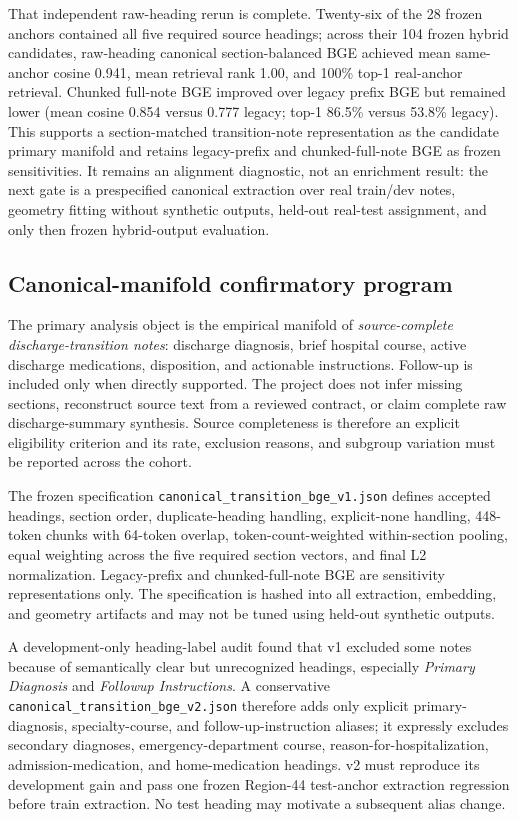 \documentclass[11pt]{article}
\begin{document}
That independent raw-heading rerun is complete.  Twenty-six of the 28 frozen anchors contained all five required source headings; across their 104 frozen hybrid candidates, raw-heading canonical section-balanced BGE achieved mean same-anchor cosine 0.941, mean retrieval rank 1.00, and 100\% top-1 real-anchor retrieval.  Chunked full-note BGE improved over legacy prefix BGE but remained lower (mean cosine 0.854 versus 0.777 legacy; top-1 86.5\% versus 53.8\% legacy).  This supports a section-matched transition-note representation as the candidate primary manifold and retains legacy-prefix and chunked-full-note BGE as frozen sensitivities.  It remains an alignment diagnostic, not an enrichment result: the next gate is a prespecified canonical extraction over real train/dev notes, geometry fitting without synthetic outputs, held-out real-test assignment, and only then frozen hybrid-output evaluation.

\subsection{Canonical-manifold confirmatory program}

The primary analysis object is the empirical manifold of \emph{source-complete discharge-transition notes}: discharge diagnosis, brief hospital course, active discharge medications, disposition, and actionable instructions.  Follow-up is included only when directly supported.  The project does not infer missing sections, reconstruct source text from a reviewed contract, or claim complete raw discharge-summary synthesis.  Source completeness is therefore an explicit eligibility criterion and its rate, exclusion reasons, and subgroup variation must be reported across the cohort.

The frozen specification \texttt{canonical\_transition\_bge\_v1.json} defines accepted headings, section order, duplicate-heading handling, explicit-none handling, 448-token chunks with 64-token overlap, token-count-weighted within-section pooling, equal weighting across the five required section vectors, and final L2 normalization.  Legacy-prefix and chunked-full-note BGE are sensitivity representations only.  The specification is hashed into all extraction, embedding, and geometry artifacts and may not be tuned using held-out synthetic outputs.

A development-only heading-label audit found that v1 excluded some notes because of semantically clear but unrecognized headings, especially \emph{Primary Diagnosis} and \emph{Followup Instructions}.  A conservative \texttt{canonical\_transition\_bge\_v2.json} therefore adds only explicit primary-diagnosis, specialty-course, and follow-up-instruction aliases; it expressly excludes secondary diagnoses, emergency-department course, reason-for-hospitalization, admission-medication, and home-medication headings.  v2 must reproduce its development gain and pass one frozen Region-44 test-anchor extraction regression before train extraction.  No test heading may motivate a subsequent alias change.
\end{document}

